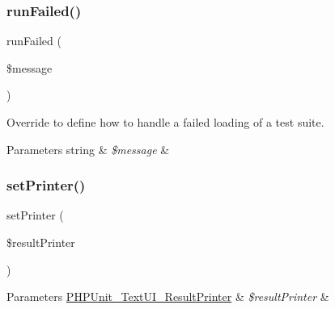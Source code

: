 \subsubsection{\texorpdfstring{run\+Failed()}{runFailed()}}
{\footnotesize\ttfamily run\+Failed (\begin{DoxyParamCaption}\item[{}]{\$message }\end{DoxyParamCaption})\hspace{0.3cm}{\ttfamily [protected]}}

Override to define how to handle a failed loading of a test suite.


\begin{DoxyParams}[1]{Parameters}
string & {\em \$message} & \\
\hline
\end{DoxyParams}
\mbox{\label{class_p_h_p_unit___text_u_i___test_runner_ae3026497b1f5c470fc9a4cf0f9d105e8}} 
\subsubsection{\texorpdfstring{set\+Printer()}{setPrinter()}}
{\footnotesize\ttfamily set\+Printer (\begin{DoxyParamCaption}\item[{\mbox{\hyperlink{class_p_h_p_unit___text_u_i___result_printer}{P\+H\+P\+Unit\+\_\+\+Text\+U\+I\+\_\+\+Result\+Printer}}}]{\$result\+Printer }\end{DoxyParamCaption})}


\begin{DoxyParams}[1]{Parameters}
\mbox{\hyperlink{class_p_h_p_unit___text_u_i___result_printer}{P\+H\+P\+Unit\+\_\+\+Text\+U\+I\+\_\+\+Result\+Printer}} & {\em \$result\+Printer} & \\
\hline
\end{DoxyParams}
\mbox{\label{class_p_h_p_unit___text_u_i___test_runner_ab3c1b3a323cbbf707c55cc3cd3efd811}} 
